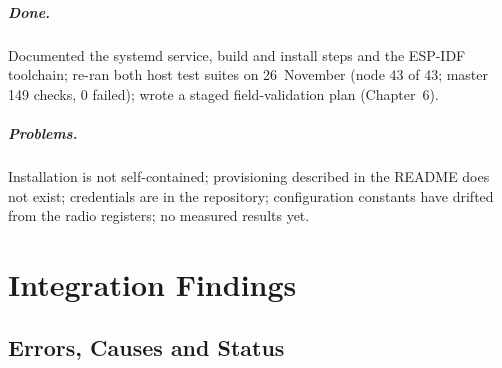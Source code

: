 \documentclass{tietreport}
\begin{document}
\paragraph{Done.} Documented the systemd service, build and install
steps and the ESP-IDF toolchain; re-ran both host test suites on
26~November (node 43 of 43; master 149 checks, 0 failed); wrote a
staged field-validation plan (Chapter~6).

\paragraph{Problems.} Installation is not self-contained;
provisioning described in the README does not exist; credentials are
in the repository; configuration constants have drifted from the
radio registers; no measured results yet.

\chapter{Integration Findings}

\section{Errors, Causes and Status}
\end{document}
